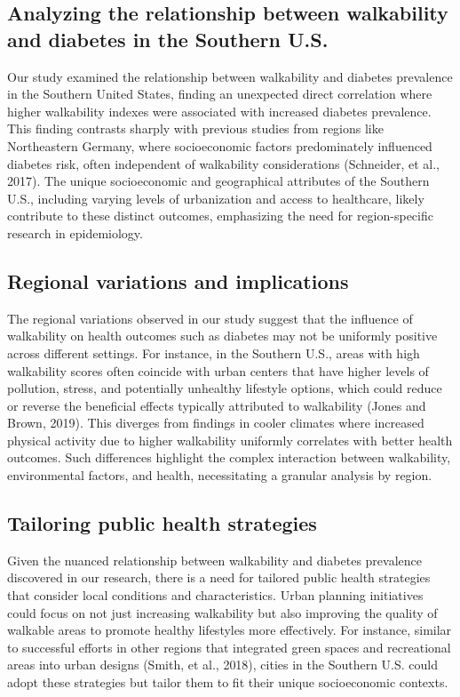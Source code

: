 \documentclass[
]{article}
\begin{document}
\subsection{Analyzing the relationship between walkability and diabetes
in the Southern
U.S.}\label{analyzing-the-relationship-between-walkability-and-diabetes-in-the-southern-u.s.}

Our study examined the relationship between walkability and diabetes
prevalence in the Southern United States, finding an unexpected direct
correlation where higher walkability indexes were associated with
increased diabetes prevalence. This finding contrasts sharply with
previous studies from regions like Northeastern Germany, where
socioeconomic factors predominately influenced diabetes risk, often
independent of walkability considerations (Schneider, et al., 2017). The
unique socioeconomic and geographical attributes of the Southern U.S.,
including varying levels of urbanization and access to healthcare,
likely contribute to these distinct outcomes, emphasizing the need for
region-specific research in epidemiology.

\subsection{Regional variations and
implications}\label{regional-variations-and-implications}

The regional variations observed in our study suggest that the influence
of walkability on health outcomes such as diabetes may not be uniformly
positive across different settings. For instance, in the Southern U.S.,
areas with high walkability scores often coincide with urban centers
that have higher levels of pollution, stress, and potentially unhealthy
lifestyle options, which could reduce or reverse the beneficial effects
typically attributed to walkability (Jones and Brown, 2019). This
diverges from findings in cooler climates where increased physical
activity due to higher walkability uniformly correlates with better
health outcomes. Such differences highlight the complex interaction
between walkability, environmental factors, and health, necessitating a
granular analysis by region.

\subsection{Tailoring public health
strategies}\label{tailoring-public-health-strategies}

Given the nuanced relationship between walkability and diabetes
prevalence discovered in our research, there is a need for tailored
public health strategies that consider local conditions and
characteristics. Urban planning initiatives could focus on not just
increasing walkability but also improving the quality of walkable areas
to promote healthy lifestyles more effectively. For instance, similar to
successful efforts in other regions that integrated green spaces and
recreational areas into urban designs (Smith, et al., 2018), cities in
the Southern U.S. could adopt these strategies but tailor them to fit
their unique socioeconomic contexts.
\end{document}
